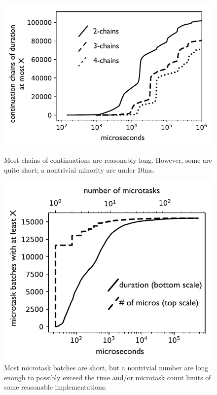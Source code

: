\documentclass[acmsmall,anonymous,review]{acmart}\settopmatter{printfolios=true,printccs=false,printacmref=false}
\begin{document}
\begin{figure}
    \centering
    \begin{minipage}[t]{0.47\textwidth}
        \centering
        \includegraphics[width=1.0\textwidth]{Graphs/chains_bw}
        \caption{Most chains of continuations are reasonably long.
        However, some are quite short; a nontrivial minority are under 10ms.}
        \label{fig:graph_chains}
    \end{minipage}\hfill
    \begin{minipage}[t]{0.47\textwidth}
        \centering
        \includegraphics[width=1.0\textwidth]{micros_graph_bw}
        \caption{Most microtask batches are short, but a nontrivial number are long enough to possibly exceed the time and/or microtask count limits of some reasonable implementations.}
        \label{fig:graph_microtasks}
    \end{minipage}
\end{figure}
\end{document}
